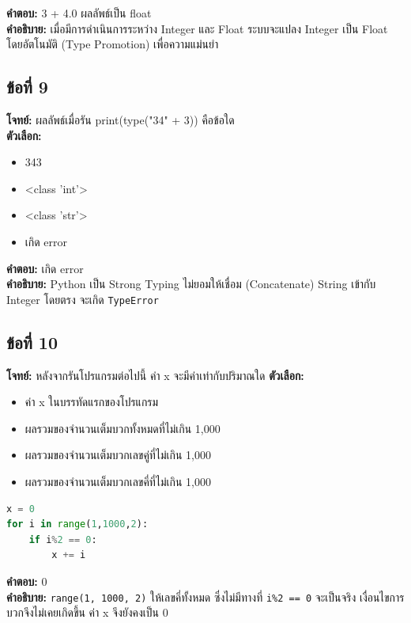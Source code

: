 \documentclass[12pt]{article}
\begin{document}
\textbf{คำตอบ:} 3 + 4.0 ผลลัพธ์เป็น float\\
\textbf{คำอธิบาย:} เมื่อมีการดำเนินการระหว่าง Integer และ Float ระบบจะแปลง Integer เป็น Float โดยอัตโนมัติ (Type Promotion) เพื่อความแม่นยำ

\subsection*{ข้อที่ 9}
\textbf{โจทย์:} ผลลัพธ์เมื่อรัน print(type("34" + 3)) คือข้อใด\\
\textbf{ตัวเลือก:}
\begin{itemize}
    \item 343
    \item <class 'int'>
    \item <class 'str'>
    \item เกิด error
\end{itemize}

\textbf{คำตอบ:} เกิด error\\
\textbf{คำอธิบาย:} Python เป็น Strong Typing ไม่ยอมให้เชื่อม (Concatenate) String เข้ากับ Integer โดยตรง จะเกิด \texttt{TypeError}

\subsection*{ข้อที่ 10}
\textbf{โจทย์:} หลังจากรันโปรแกรมต่อไปนี้ ค่า x จะมีค่าเท่ากับปริมาณใด
\textbf{ตัวเลือก:}
\begin{itemize}
    \item ค่า x ในบรรทัดแรกของโปรแกรม
    \item ผลรวมของจำนวนเต็มบวกทั้งหมดที่ไม่เกิน 1,000
    \item ผลรวมของจำนวนเต็มบวกเลขคู่ที่ไม่เกิน 1,000
    \item ผลรวมของจำนวนเต็มบวกเลขคี่ที่ไม่เกิน 1,000
\end{itemize}
\begin{lstlisting}[language=Python]
x = 0
for i in range(1,1000,2):
    if i%2 == 0:
        x += i
\end{lstlisting}
\textbf{คำตอบ:} 0\\
\textbf{คำอธิบาย:} \texttt{range(1, 1000, 2)} ให้เลขคี่ทั้งหมด ซึ่งไม่มีทางที่ \texttt{i\%2 == 0} จะเป็นจริง เงื่อนไขการบวกจึงไม่เคยเกิดขึ้น ค่า x จึงยังคงเป็น 0
\end{document}
